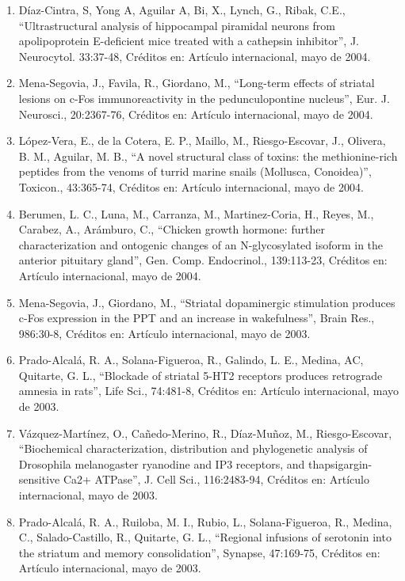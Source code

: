 \begin{enumerate}
\item Díaz-Cintra, S, Yong A, Aguilar A, Bi, X., Lynch, G., Ribak, C.E., “Ultrastructural analysis of hippocampal piramidal 
neurons from apolipoprotein E-deficient mice treated with a cathepsin inhibitor”, J. Neurocytol. 33:37-48, Créditos en: 
Artículo internacional, mayo de 2004.

\item Mena-Segovia, J., Favila, R., Giordano, M., “Long-term effects of striatal lesions on c-Fos immunoreactivity in the 
pedunculopontine nucleus”, Eur. J. Neurosci., 20:2367-76, Créditos en: Artículo internacional, mayo de 2004.

\item López-Vera, E., de la Cotera, E. P., Maillo, M., Riesgo-Escovar, J., Olivera, B. M., Aguilar, M. B., “A novel 
structural class of toxins: the methionine-rich peptides from the venoms of turrid marine snails (Mollusca, Conoidea)”, 
Toxicon., 43:365-74, Créditos en: Artículo internacional, mayo de 2004.

\item Berumen, L. C., Luna, M., Carranza, M., Martinez-Coria, H., Reyes, M., Carabez, A., Arámburo, C., “Chicken growth 
hormone: further characterization and ontogenic changes of an N-glycosylated isoform in the anterior pituitary gland”, Gen. 
Comp. Endocrinol., 139:113-23, Créditos en: Artículo internacional, mayo de 2004.

\item Mena-Segovia, J., Giordano, M., “Striatal dopaminergic stimulation produces c-Fos expression in the PPT and an 
increase 
in wakefulness”, Brain Res., 986:30-8, Créditos en: Artículo internacional, mayo de 2003.

\item Prado-Alcalá, R. A., Solana-Figueroa, R., Galindo, L. E., Medina, AC, Quitarte, G. L., “Blockade of striatal 5-HT2 
receptors produces retrograde amnesia in rats”, Life Sci., 74:481-8, Créditos en: Artículo internacional, mayo de 2003.

\item Vázquez-Martínez, O., Cañedo-Merino, R., Díaz-Muñoz, M., Riesgo-Escovar, “Biochemical characterization, distribution 
and phylogenetic analysis of Drosophila melanogaster ryanodine and IP3 receptors, and thapsigargin-sensitive Ca2+ ATPase”, 
J. Cell Sci., 116:2483-94, Créditos en: Artículo internacional, mayo de 2003.

\item Prado-Alcalá, R. A., Ruiloba, M. I., Rubio, L., Solana-Figueroa, R., Medina, C., Salado-Castillo, R., Quitarte, G. 
L., 
“Regional infusions of serotonin into the striatum and memory consolidation”, Synapse, 47:169-75, Créditos en: Artículo 
internacional, mayo de 2003.


\end{enumerate}
